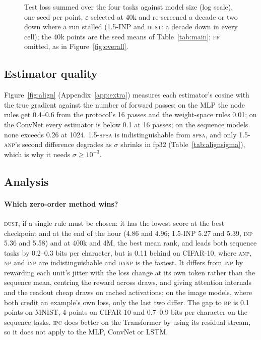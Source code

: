 \documentclass{article}
\newcommand{\method}[1]{\textsc{#1}}
\newcommand{\BP}{\method{bp}}
\newcommand{\SPSA}{\method{spsa}}
\newcommand{\SPSAb}{\method{1.5-spsa}}
\newcommand{\NP}{\method{np}}
\newcommand{\ANP}{\method{anp}}
\newcommand{\ANPb}{\method{1.5-anp}}
\newcommand{\INP}{\method{inp}}
\newcommand{\DANP}{\method{danp}}
\newcommand{\FF}{\method{ff}}
\newcommand{\DUST}{\method{dust}}
\newcommand{\IPC}{\method{ipc}}
\begin{document}
\begin{figure}[t]
  \centering
  
  \caption{Test loss summed over the four tasks against model size (log scale), one
  seed per point, $\varepsilon$ selected at 40k and re-screened a decade or two down where
  a run stalled (1.5-INP and \DUST{}: a decade down in every cell); the 40k points are the
  seed means of Table~\ref{tab:main}; \FF{} omitted, as in Figure~\ref{fig:overall}.}
  \label{fig:scale}
\end{figure}

\subsection{Estimator quality}
\label{sec:align}

Figure~\ref{fig:align} (Appendix~\ref{app:extra}) measures each estimator's cosine with
the true gradient against the number of forward passes: on the MLP the node rules get
0.4--0.6 from the protocol's 16 passes and the weight-space rules 0.01; on the ConvNet
every estimator is below 0.1 at 16 passes; on the sequence models none exceeds 0.26 at
1024. \SPSAb{} is indistinguishable from \SPSA{}, and only \ANPb{}'s second difference
degrades as $\sigma$ shrinks in fp32 (Table~\ref{tab:alignsigma}), which is why it needs
$\sigma\ge10^{-3}$.

\subsection{Analysis}
\label{sec:analysis}

\paragraph{Which zero-order method wins?}
\DUST{}, if a single rule must be chosen: it has the lowest score at the best checkpoint
and at the end of the hour (4.86 and 4.96; 1.5-INP 5.27 and 5.39, \INP{} 5.36 and 5.58)
and at 400k and 4M, the best mean rank, and leads both sequence tasks by 0.2--0.3 bits per character, but is
0.11 behind on CIFAR-10, where \ANP{}, \NP{} and \INP{} are indistinguishable and \DANP{}
is the fastest. It differs from \INP{} by rewarding each unit's jitter with the loss change
at its own token rather than the sequence mean, centring the reward across draws, and
giving attention internals and the readout cheap draws on cached activations; on the image
models, where both credit an example's own loss, only the last two differ. The gap to \BP{} is 0.1 points on MNIST,
4 points on CIFAR-10 and 0.7--0.9 bits per character on the sequence tasks. \IPC{} does better on the Transformer by using its
residual stream, so it does not apply to the MLP, ConvNet or LSTM.
\end{document}
